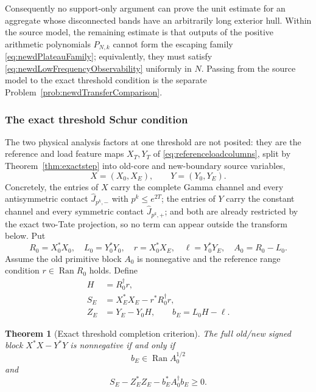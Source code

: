\documentclass[11pt]{amsart}
\newtheorem{theorem}{Theorem}[section]
\theoremstyle{definition}
\theoremstyle{remark}
\begin{document}
Consequently no support-only argument can prove the unit estimate for an
aggregate whose disconnected bands have an arbitrarily long exterior
hull.  Within the source model, the remaining estimate is that outputs of
the positive arithmetic polynomials $P_{N,k}$ cannot form the escaping
family \eqref{eq:newdPlateauFamily}; equivalently, they must satisfy
\eqref{eq:newdLowFrequencyObservability} uniformly in $N$.  Passing from the
source model to the exact threshold condition is the separate
Problem~\ref{prob:newdTransferComparison}.

\subsubsection{The exact threshold Schur condition}

The two physical analysis factors at one threshold are not posited: they are
the reference and load feature maps \(X_T,Y_T\) of
\eqref{eq:referenceloadcolumns}, split by
Theorem~\ref{thm:exactstep} into old-core and new-boundary source variables,
\[
 X=(X_0,X_E),\qquad Y=(Y_0,Y_E).
\]
Concretely, the entries of \(X\) carry the complete Gamma channel and every
antisymmetric contact \(\widehat J_{p^k,-}\) with \(p^k\le e^{2T}\); the
entries of \(Y\) carry the constant channel and every symmetric contact
\(\widehat J_{p^k,+}\); and both are already restricted by the exact two-Tate
projection, so no term can appear outside the transform below.  Put
\begin{equation}\label{eq:newdPhysicalBlocks}
 R_0=X_0^*X_0,
 \quad L_0=Y_0^*Y_0,
 \quad r=X_0^*X_E,
 \quad \ell=Y_0^*Y_E,
 \quad A_0=R_0-L_0.
\end{equation}
Assume the old primitive block $A_0$ is nonnegative and the reference range
condition $r\in\operatorname{Ran}R_0$ holds.  Define
\begin{align}
 H&=R_0^\dagger r,
 \label{eq:newdReferenceLift}\\
 S_E&=X_E^*X_E-r^*R_0^\dagger r,
 \label{eq:newdReferenceSchur}\\
 Z_E&=Y_E-Y_0H,
 \qquad
 b_E=L_0H-\ell.
 \label{eq:newdOppositeResidual}
\end{align}

\begin{theorem}[Exact threshold completion criterion]
\label{thm:newdThresholdCriterion}
The full old/new signed block $X^*X-Y^*Y$ is nonnegative if and only if
\begin{equation}\label{eq:newdRangeCondition}
 b_E\in\operatorname{Ran}A_0^{1/2}
\end{equation}
and
\begin{equation}\label{eq:newdSchurTarget}
 S_E-Z_E^*Z_E-b_E^*A_0^\dagger b_E\geq0.
\end{equation}
\end{theorem}
\end{document}
